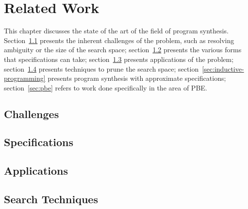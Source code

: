 \chapter{Related Work}
\label{chapter:relatedWork}


This chapter discusses the state of the art of the field of program synthesis.
Section~\ref{sec:challenges} presents the inherent challenges of the problem,
such as resolving ambiguity or the size of the search space;
section~\ref{sec:specifications} presents the various forms
that specifications can take;
section~\ref{sec:applications} presents applications of the problem;
section~\ref{sec:search-techniques} presents techniques to prune the search
space;
section~\ref{sec:inductive-programming} presents program synthesis with
approximate specifications;
section~\ref{sec:pbe} refers to work done specifically in the area of
\ac{PBE}.

\section{Challenges}
\label{sec:challenges}

\section{Specifications}
\label{sec:specifications}


\section{Applications}
\label{sec:applications}


\section{Search Techniques}
\label{sec:search-techniques}


